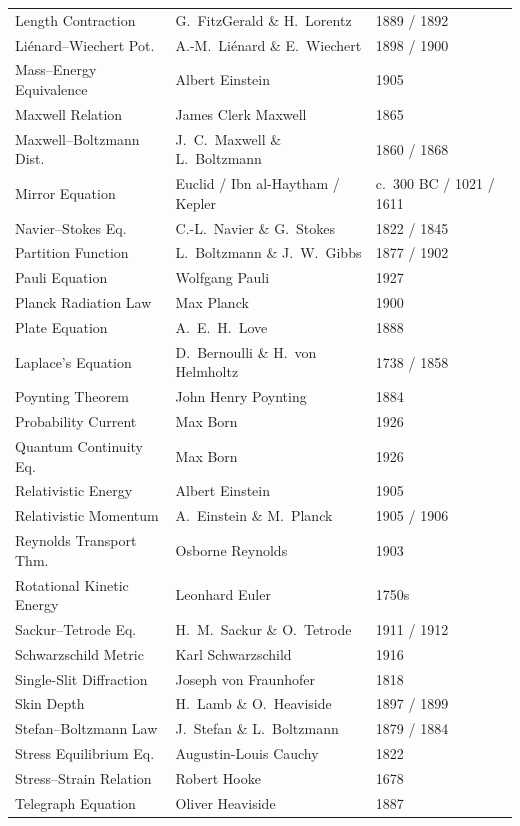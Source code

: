 \begin{longtable}{p{6cm}p{6cm}p{2.5cm}}
Length Contraction & G.\ FitzGerald \& H.\ Lorentz & 1889 / 1892 \\
Li\'enard--Wiechert Pot. & A.-M.\ Li\'enard \& E.\ Wiechert & 1898 / 1900 \\
Mass--Energy Equivalence & Albert Einstein & 1905 \\
Maxwell Relation & James Clerk Maxwell & 1865 \\
Maxwell--Boltzmann Dist. & J.\ C.\ Maxwell \& L.\ Boltzmann & 1860 / 1868 \\
Mirror Equation & Euclid / Ibn al-Haytham / Kepler & c.\ 300 BC / 1021 / 1611 \\
Navier--Stokes Eq. & C.-L.\ Navier \& G.\ Stokes & 1822 / 1845 \\
Partition Function & L.\ Boltzmann \& J.\ W.\ Gibbs & 1877 / 1902 \\
Pauli Equation & Wolfgang Pauli & 1927 \\
Planck Radiation Law & Max Planck & 1900 \\
Plate Equation & A.\ E.\ H.\ Love & 1888 \\
Laplace's Equation & D.\ Bernoulli \& H.\ von Helmholtz & 1738 / 1858 \\
Poynting Theorem & John Henry Poynting & 1884 \\
Probability Current & Max Born & 1926 \\
Quantum Continuity Eq. & Max Born & 1926 \\
Relativistic Energy & Albert Einstein & 1905 \\
Relativistic Momentum & A.\ Einstein \& M.\ Planck & 1905 / 1906 \\
Reynolds Transport Thm. & Osborne Reynolds & 1903 \\
Rotational Kinetic Energy & Leonhard Euler & 1750s \\
Sackur--Tetrode Eq. & H.\ M.\ Sackur \& O.\ Tetrode & 1911 / 1912 \\
Schwarzschild Metric & Karl Schwarzschild & 1916 \\
Single-Slit Diffraction & Joseph von Fraunhofer & 1818 \\
Skin Depth & H.\ Lamb \& O.\ Heaviside & 1897 / 1899 \\
Stefan--Boltzmann Law & J.\ Stefan \& L.\ Boltzmann & 1879 / 1884 \\
Stress Equilibrium Eq. & Augustin-Louis Cauchy & 1822 \\
Stress--Strain Relation & Robert Hooke & 1678 \\
Telegraph Equation & Oliver Heaviside & 1887 \\

\end{longtable}
